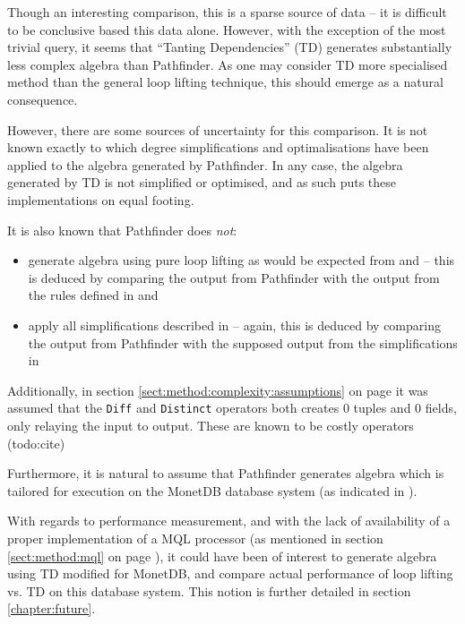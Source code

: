 Though an interesting comparison, this is a sparse source of data -- it
is difficult to be conclusive based this data alone. However, with the
exception of the most trivial query, it seems that ``Tanting Dependencies'' (TD)
generates substantially less complex algebra than Pathfinder. As one
may consider TD more specialised method than the general loop lifting technique, this should
emerge as a natural consequence.

However, there are some sources of uncertainty for this comparison. It is not
known exactly to which degree simplifications and optimalisations have been
applied to the algebra generated by Pathfinder. In any case, the
algebra generated by TD is not simplified or optimised, and as such puts these
implementations on equal footing. 

It is also known that Pathfinder does \emph{not}:
\begin{itemize}
  \item generate algebra using pure loop lifting as would be expected from
  \cite{pathfinder_mothertongue} and \cite{pathfinder_purelyRelational} -- this
  is deduced by comparing the output from Pathfinder with the output
  from the rules defined in \cite{pathfinder_mothertongue} and
  \cite{pathfinder_purelyRelational}
  \item apply all simplifications described in
  \cite{pathfinder_purelyRelational} -- again, this is deduced by comparing the
  output from Pathfinder with the supposed output from the simplifications in
  \cite{pathfinder_purelyRelational}
\end{itemize}

Additionally, in section \ref{sect:method:complexity:assumptions} on page
\pageref{sect:method:complexity:assumptions} it was assumed that
the \texttt{Diff} and \texttt{Distinct} operators both creates 0 tuples and 0
fields, only relaying the input to output. These are known to be costly
operators (todo:cite)

Furthermore, it is natural to assume that Pathfinder generates algebra
which is tailored for execution on the MonetDB database system (as indicated
in \cite{pathfinder_purelyRelational}).

With regards to performance measurement, and with the lack of availability of a
proper implementation of a MQL processor (as mentioned in section
\ref{sect:method:mql} on page \pageref{sect:method:mql}), it could have been
of interest to generate algebra using TD modified for MonetDB, and compare
actual performance of loop lifting vs. TD on this database system. This notion
is further detailed in section \ref{chapter:future}.

